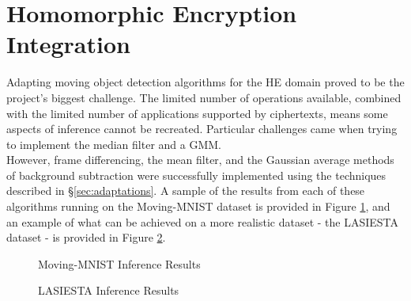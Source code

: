 \setlength{\leftskip}{0cm}




\section{Homomorphic Encryption Integration}
\label{sec:integration}
\setlength{\leftskip}{0.25cm}
\indent \indent
Adapting moving object detection algorithms for the HE domain proved to be the project's biggest challenge. The limited number of operations available, combined with the limited number of applications supported by ciphertexts, means some aspects of inference cannot be recreated. Particular challenges came when trying to implement the median filter and a GMM.
\smallskip \\ \indent
However, frame differencing, the mean filter, and the Gaussian average methods of background subtraction were successfully implemented using the techniques described in §\ref{sec:adaptations}. A sample of the results from each of these algorithms running on the Moving-MNIST dataset is provided in Figure \ref{fig:mnistInferenceResults}, and an example of what can be achieved on a more realistic dataset - the LASIESTA dataset - is provided in Figure \ref{fig:lasiestaInferenceResults}.
\begin{figure}
    \centering
    
    \caption{Moving-MNIST Inference Results}
    \label{fig:mnistInferenceResults}
\end{figure}
\begin{figure}
    \centering
    
    \caption{LASIESTA Inference Results}
    \label{fig:lasiestaInferenceResults}
\end{figure}
\setlength{\leftskip}{0cm}
